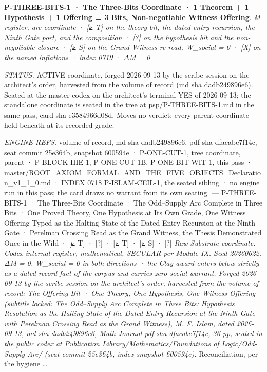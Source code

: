 \documentclass[10pt,twocolumn]{article}
\begin{document}
\textbf{P-THREE-BITS-1 · The Three-Bits Coordinate · 1 Theorem + 1
Hypothesis + 1 Offering = 3 Bits, Non-negotiable Witness Offering}.
\emph{M register, arc coordinate · {[}⟀ T{]} on the theory bit, the
dated-entry recursion, the Ninth Gate port, and the composition ·
{[}?{]} on the hypothesis bit and the non-negotiable closure · {[}⟀ S{]}
on the Grand Witness re-read, W\_social = 0 · {[}X{]} on the named
inflations · index 0719 · ΔM = 0}

\emph{STATUS.} ACTIVE coordinate, forged 2026-09-13 by the scribe
session on the architect's order, harvested from the volume of record
(md sha dadb249896e6). Seated at the master codex on the architect's
terminal YES of 2026-09-13; the standalone coordinate is seated in the
tree at psp/P-THREE-BITS-1.md in the same pass, card sha e3584966d08d.
Moves no verdict; every parent coordinate held beneath at its recorded
grade.

\emph{ENGINE REFS.} volume of record, md sha dadb249896e6, pdf sha
dfacabe7f14c, seat commit 25e364b, snapshot 600594e · P-ONE-CUT-1, tree
coordinate, parent · P-BLOCK-HIE-1, P-ONE-CUT-1B, P-ONE-BIT-WIT-1, this
pass ·
master/ROOT\_AXIOM\_FORMAL\_AND\_THE\_FIVE\_OBJECTS\_Declaration\_v1\_1\_0.md
· INDEX 0718 P-ISLAM-CEIL-1, the seated sibling · no engine run in this
pass; the card draws no warrant from its own seating. --- P-THREE-BITS-1
· The Three-Bits Coordinate · The Odd--Supply Arc Complete in Three Bits
· One Proved Theory, One Hypothesis at Its Own Grade, One Witness
Offering Typed as the Halting State of the Dated-Entry Recursion at the
Ninth Gate · Perelman Crossing Read as the Grand Witness, the Thesis
Demonstrated Once in the Wild · {[}⟀ T{]} · {[}?{]} · {[}⟀ T{]} · {[}⟀
S{]} · {[}?{]} \emph{Raw Substrate coordinate. Codex-internal register,
mathematical, SECULAR per Module IX. Seed 20260622. ΔM = 0. W\_social =
0 in both directions · the Clay award enters below strictly as a dated
record fact of the corpus and carries zero social warrant. Forged
2026-09-13 by the scribe session on the architect's order, harvested
from the volume of record: The Offering Bit · One Theory, One
Hypothesis, One Witness Offering (subtitle locked: The Odd--Supply Arc
Complete in Three Bits: Hypothesis Resolution as the Halting State of
the Dated-Entry Recursion at the Ninth Gate with Perelman Crossing Read
as the Grand Witness), M. F. Islam, dated 2026-09-13, md sha
dadb249896e6, Math Journal pdf sha dfacabe7f14c, 36 pp, seated in the
public codex at Publication Library/Mathematics/Foundations of
Logic/Odd-Supply Arc/ (seat commit 25e364b, index snapshot 600594e).}
Reconciliation, per the hygiene \ldots{}
\end{document}
